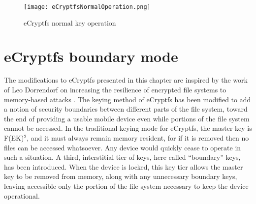 \begin{figure}[htb]
\begin{center}
\texttt{[image: eCryptfsNormalOperation.png]} \end{center}
\caption{eCryptfs normal key operation} \label{fig:ecryptfsnormal} \end{figure}

\section{eCryptfs boundary mode}
\label{sec:boundarymode}
The modifications to eCryptfs presented in this chapter are inspired by the work of Leo Dorrendorf on increasing the resilience of
encrypted file systems to memory-based attacks \cite{Dorrendorf2011}. The keying method of eCryptfs has been modified to add a
notion of security boundaries between different parts of the file system, toward the end of providing a usable mobile device even
while portions of the file system cannot be accessed. In the traditional keying mode for eCryptfs, the master key is
F(EK)$^{2}$, and it must always remain memory resident, for if it is removed then no files can be accessed whatsoever.
Any device would quickly cease to operate in such a situation. A third, interstitial tier of keys, here called ``boundary'' keys, has
been introduced. When the device is locked, this key tier allows the master key to be removed from memory, along with any unnecessary
boundary keys, leaving accessible only the portion of the file system necessary to keep the device operational.

